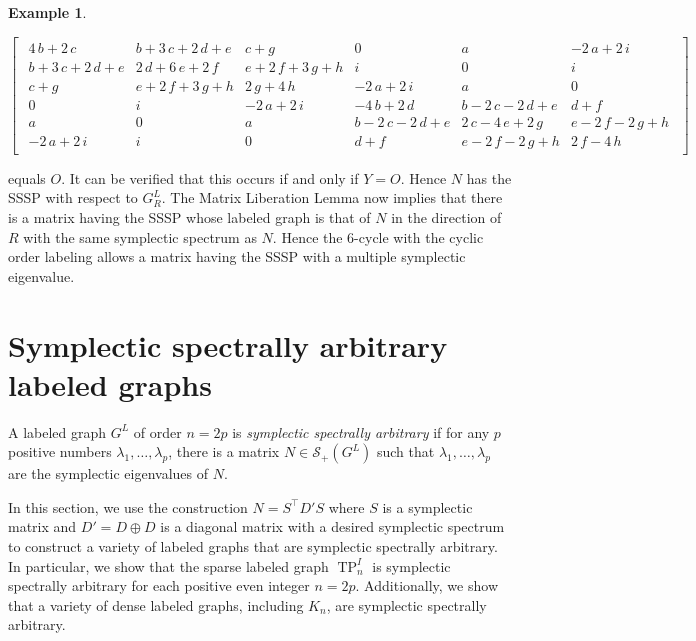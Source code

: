 \documentclass[12pt]{article}
\theoremstyle{definition}
\theoremstyle{definition}
\theoremstyle{definition}
\newtheorem{ex}[thm]{Example}
\numberwithin{figure}{section}
\numberwithin{equation}{section}
\newcommand{\symp}{\mathcal{S}_+}
\newcommand{\tp}{\operatorname{TP}}
\newcommand{\trans}{^{\top}}
\newcommand{\lam}{\lambda}
\begin{document}
\begin{ex}
\begin{center}
\resizebox{\linewidth}{!}
{$
\begin{bmatrix}\begin{array}{cccccc}
4 \, b + 2 \, c & b + 3 \, c + 2 \, d + e & c + g & 0 & a & -2 \, a + 2 \, i \\
b + 3 \, c + 2 \, d + e & 2 \, d + 6 \, e + 2 \, f & e + 2 \, f + 3 \, g + h & i & 0 & i \\
c + g & e + 2 \, f + 3 \, g + h & 2 \, g + 4 \, h & -2 \, a + 2 \, i & a & 0 \\
0 & i & -2 \, a + 2 \, i & -4 \, b + 2 \, d & b - 2 \, c - 2 \, d + e & d + f \\
a & 0 & a & b - 2 \, c - 2 \, d + e & 2 \, c - 4 \, e + 2 \, g & e - 2 \, f - 2 \, g + h \\
-2 \, a + 2 \, i & i & 0 & d + f & e - 2 \, f - 2 \, g + h & 2 \, f - 4 \, h
\end{array}\end{bmatrix}
$}
\end{center}
equals $O$. It can be verified that this occurs if and only if $Y=O$.  Hence $N$ has the SSSP with respect to $G^L_R$. 
The Matrix Liberation Lemma now implies that there is a matrix having the SSSP 
whose labeled graph is that of $N$ in the direction of $R$ 
with the same symplectic spectrum as $N$.  
Hence the 6-cycle with  the cyclic order labeling 
allows a matrix having the SSSP with a multiple symplectic eigenvalue. 
\end{ex}




\section{Symplectic spectrally arbitrary labeled graphs}\label{s:ssa} 


A labeled graph $G^L$ of order $n=2p$  is \emph{symplectic spectrally arbitrary} if for any $p$ positive numbers $\lam_1,\dots,\lam_p$, there is a   matrix $N\in\symp(G^L)$ such that $\lam_1,\dots,\lam_p$ are the symplectic eigenvalues of $N$.




In this section, we use the construction $N=S\trans D'S$ where  $S$ is a  symplectic matrix  and  $D'=D\oplus D$ is a diagonal matrix
with a desired symplectic spectrum  to construct  a variety of labeled graphs that are symplectic spectrally arbitrary. In particular, we  show that the sparse labeled graph  $\tp_n^I$ is symplectic spectrally arbitrary 
for each positive even integer $n=2p$. 
Additionally, we show that a  variety of dense labeled graphs, including  $K_{n}$, 
are symplectic spectrally arbitrary. 
\end{document}
